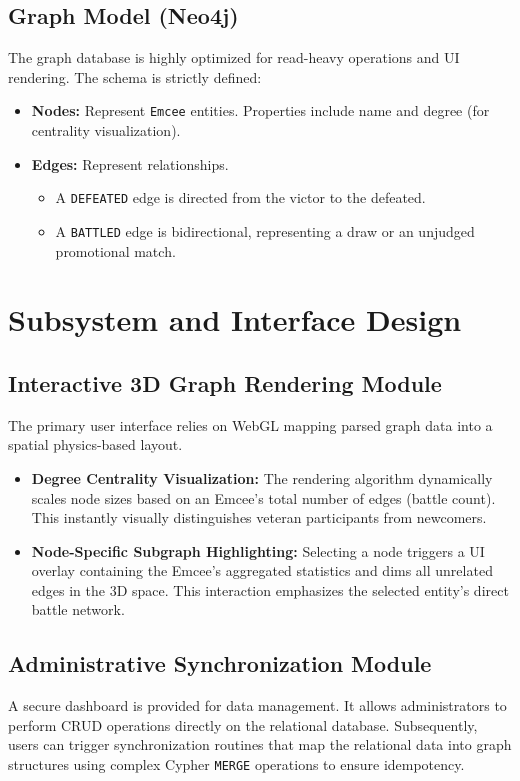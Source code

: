 \documentclass[12pt,a4paper]{article}
\begin{document}
\subsection{Graph Model (Neo4j)}
The graph database is highly optimized for read-heavy operations and UI rendering. The schema is strictly defined:
\begin{itemize}
    \item \textbf{Nodes:} Represent \texttt{Emcee} entities. Properties include name and degree (for centrality visualization).
    \item \textbf{Edges:} Represent relationships. 
    \begin{itemize}
        \item A \texttt{DEFEATED} edge is directed from the victor to the defeated.
        \item A \texttt{BATTLED} edge is bidirectional, representing a draw or an unjudged promotional match.
    \end{itemize}
\end{itemize}

\section{Subsystem and Interface Design}

\subsection{Interactive 3D Graph Rendering Module}
The primary user interface relies on WebGL mapping parsed graph data into a spatial physics-based layout.
\begin{itemize}
    \item \textbf{Degree Centrality Visualization:} The rendering algorithm dynamically scales node sizes based on an Emcee's total number of edges (battle count). This instantly visually distinguishes veteran participants from newcomers.
    \item \textbf{Node-Specific Subgraph Highlighting:} Selecting a node triggers a UI overlay containing the Emcee's aggregated statistics and dims all unrelated edges in the 3D space. This interaction emphasizes the selected entity's direct battle network.
\end{itemize}

\subsection{Administrative Synchronization Module}
A secure dashboard is provided for data management. It allows administrators to perform CRUD operations directly on the relational database. Subsequently, users can trigger synchronization routines that map the relational data into graph structures using complex Cypher \texttt{MERGE} operations to ensure idempotency.
\end{document}
